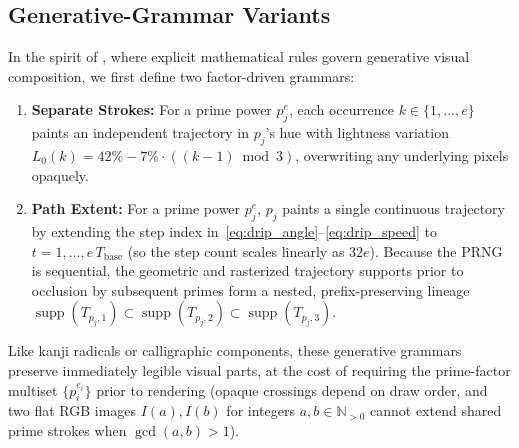 \documentclass[]{interact}
\theoremstyle{plain}
\theoremstyle{definition}
\theoremstyle{remark}
\begin{document}
\subsection{Generative-Grammar Variants}
In the spirit of \citet{franke1993generative}, where explicit mathematical rules govern generative visual composition, we first define two factor-driven grammars:
\begin{enumerate}
  \item \textbf{Separate Strokes:} For a prime power $p_j^e$, each occurrence $k \in \{1, \dots, e\}$ paints an independent trajectory in $p_j$'s hue with lightness variation $L_0(k) = 42\% - 7\% \cdot ((k - 1) \bmod 3)$, overwriting any underlying pixels opaquely.
  \item \textbf{Path Extent:} For a prime power $p_j^e$, $p_j$ paints a single continuous trajectory by extending the step index in~\eqref{eq:drip_angle}--\eqref{eq:drip_speed} to $t = 1, \dots, e\,T_{\mathrm{base}}$ (so the step count scales linearly as $32e$). Because the PRNG is sequential, the geometric and rasterized trajectory supports prior to occlusion by subsequent primes form a nested, prefix-preserving lineage $\operatorname{supp}(T_{p_j,1}) \subset \operatorname{supp}(T_{p_j,2}) \subset \operatorname{supp}(T_{p_j,3})$.
\end{enumerate}
Like kanji radicals or calligraphic components, these generative grammars preserve immediately legible visual parts, at the cost of requiring the prime-factor multiset $\{p_i^{e_i}\}$ prior to rendering (opaque crossings depend on draw order, and two flat RGB images $I(a), I(b)$ for integers $a, b \in \mathbb{N}_{>0}$ cannot extend shared prime strokes when $\gcd(a,b) > 1$).
\end{document}
